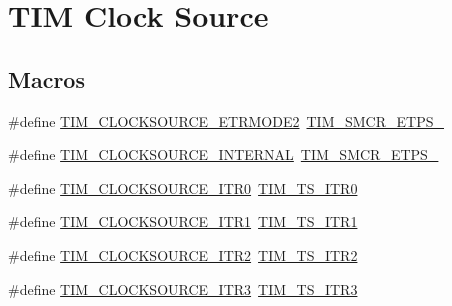 \hypertarget{group___t_i_m___clock___source}{}\section{T\+IM Clock Source}
\label{group___t_i_m___clock___source}
\subsection*{Macros}
\begin{DoxyCompactItemize}
\item 
\#define \mbox{\hyperlink{group___t_i_m___clock___source_gab133f0839cf6a4e858457d48f057eea8}{T\+I\+M\+\_\+\+C\+L\+O\+C\+K\+S\+O\+U\+R\+C\+E\+\_\+\+E\+T\+R\+M\+O\+D\+E2}}~\mbox{\hyperlink{group___peripheral___registers___bits___definition_gabf12f04862dbc92ca238d1518b27b16b}{T\+I\+M\+\_\+\+S\+M\+C\+R\+\_\+\+E\+T\+P\+S\+\_}}
\item 
\#define \mbox{\hyperlink{group___t_i_m___clock___source_ga9b398a201d8b6a4f200ebde86b1d8f3a}{T\+I\+M\+\_\+\+C\+L\+O\+C\+K\+S\+O\+U\+R\+C\+E\+\_\+\+I\+N\+T\+E\+R\+N\+AL}}~\mbox{\hyperlink{group___peripheral___registers___bits___definition_ga00b43cd09557a69ed10471ed76b228d8}{T\+I\+M\+\_\+\+S\+M\+C\+R\+\_\+\+E\+T\+P\+S\+\_}}
\item 
\#define \mbox{\hyperlink{group___t_i_m___clock___source_ga3310aa84f2f322eb77538997c070e56a}{T\+I\+M\+\_\+\+C\+L\+O\+C\+K\+S\+O\+U\+R\+C\+E\+\_\+\+I\+T\+R0}}~\mbox{\hyperlink{group___t_i_m___trigger___selection_gab7cf2b7db3956d4fd1e5a5d84f4891e7}{T\+I\+M\+\_\+\+T\+S\+\_\+\+I\+T\+R0}}
\item 
\#define \mbox{\hyperlink{group___t_i_m___clock___source_gae2da814f8d86491e7c344bb8d0f62b96}{T\+I\+M\+\_\+\+C\+L\+O\+C\+K\+S\+O\+U\+R\+C\+E\+\_\+\+I\+T\+R1}}~\mbox{\hyperlink{group___t_i_m___trigger___selection_gad90fbca297153ca9c0112a67ea2c6cb3}{T\+I\+M\+\_\+\+T\+S\+\_\+\+I\+T\+R1}}
\item 
\#define \mbox{\hyperlink{group___t_i_m___clock___source_gafb779719a41769b14303da4977f6a5f1}{T\+I\+M\+\_\+\+C\+L\+O\+C\+K\+S\+O\+U\+R\+C\+E\+\_\+\+I\+T\+R2}}~\mbox{\hyperlink{group___t_i_m___trigger___selection_ga8599ba58a5f911d648503c7ac55d4320}{T\+I\+M\+\_\+\+T\+S\+\_\+\+I\+T\+R2}}
\item 
\#define \mbox{\hyperlink{group___t_i_m___clock___source_ga0cce2af04ad903ba683515c3772abb27}{T\+I\+M\+\_\+\+C\+L\+O\+C\+K\+S\+O\+U\+R\+C\+E\+\_\+\+I\+T\+R3}}~\mbox{\hyperlink{group___t_i_m___trigger___selection_ga63183e611b91c5847040172c0069514d}{T\+I\+M\+\_\+\+T\+S\+\_\+\+I\+T\+R3}}

\end{DoxyCompactItemize}
